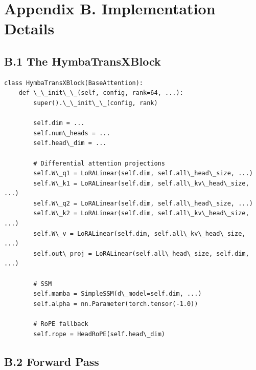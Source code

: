 \section{Appendix B. Implementation Details}

\subsection{B.1 The HymbaTransXBlock}

\begin{lstlisting}
class HymbaTransXBlock(BaseAttention):
    def \_\_init\_\_(self, config, rank=64, ...):
        super().\_\_init\_\_(config, rank)
        
        self.dim = ...
        self.num\_heads = ...
        self.head\_dim = ...
        
        # Differential attention projections
        self.W\_q1 = LoRALinear(self.dim, self.all\_head\_size, ...)
        self.W\_k1 = LoRALinear(self.dim, self.all\_kv\_head\_size, ...)
        self.W\_q2 = LoRALinear(self.dim, self.all\_head\_size, ...)
        self.W\_k2 = LoRALinear(self.dim, self.all\_kv\_head\_size, ...)
        self.W\_v = LoRALinear(self.dim, self.all\_kv\_head\_size, ...)
        self.out\_proj = LoRALinear(self.all\_head\_size, self.dim, ...)
        
        # SSM
        self.mamba = SimpleSSM(d\_model=self.dim, ...)
        self.alpha = nn.Parameter(torch.tensor(-1.0))
        
        # RoPE fallback
        self.rope = HeadRoPE(self.head\_dim)
\end{lstlisting}

\subsection{B.2 Forward Pass}


